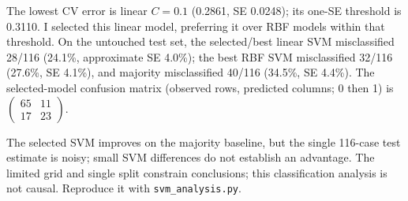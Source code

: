 \documentclass[11pt]{article}
\begin{document}
The lowest CV error is linear \(C=0.1\) (0.2861, SE 0.0248); its one-SE threshold is 0.3110. I selected this linear model, preferring it over RBF models within that threshold. On the untouched test set, the selected/best linear SVM misclassified 28/116 (24.1\%, approximate SE 4.0\%); the best RBF SVM misclassified 32/116 (27.6\%, SE 4.1\%), and majority misclassified 40/116 (34.5\%, SE 4.4\%). The selected-model confusion matrix (observed rows, predicted columns; 0 then 1) is \(\begin{pmatrix}65&11\\17&23\end{pmatrix}\).

The selected SVM improves on the majority baseline, but the single 116-case test estimate is noisy; small SVM differences do not establish an advantage. The limited grid and single split constrain conclusions; this classification analysis is not causal. Reproduce it with \texttt{svm\_analysis.py}.

\clearpage

\end{document}
